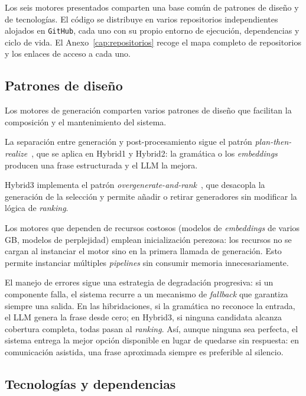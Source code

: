 Los seis motores presentados comparten una base común de patrones de diseño y de tecnologías. El código se distribuye en varios repositorios independientes alojados en \texttt{GitHub}, cada uno con su propio entorno de ejecución, dependencias y ciclo de vida. El Anexo~\ref{cap:repositorios} recoge el mapa completo de repositorios y los enlaces de acceso a cada uno.

\subsection{Patrones de diseño}

Los motores de generación comparten varios patrones de diseño que facilitan la composición y el mantenimiento del sistema.

La separación entre generación y post-procesamiento sigue el patrón \textit{plan-then-realize}~\cite{moryossef2019stepbystep}, que se aplica en Hybrid1 y Hybrid2: la gramática o los \textit{embeddings} producen una frase estructurada y el LLM la mejora.

Hybrid3 implementa el patrón \textit{overgenerate-and-rank}~\cite{sharma2019overgenerate}, que desacopla la generación de la selección y permite añadir o retirar generadores sin modificar la lógica de \textit{ranking}.

Los motores que dependen de recursos costosos (modelos de \textit{embeddings} de varios GB, modelos de perplejidad) emplean inicialización perezosa: los recursos no se cargan al instanciar el motor sino en la primera llamada de generación. Esto permite instanciar múltiples \textit{pipelines} sin consumir memoria innecesariamente.

El manejo de errores sigue una estrategia de degradación progresiva: si un componente falla, el sistema recurre a un mecanismo de \textit{fallback} que garantiza siempre una salida. En las hibridaciones, si la gramática no reconoce la entrada, el LLM genera la frase desde cero; en Hybrid3, si ninguna candidata alcanza cobertura completa, todas pasan al \textit{ranking}. Así, aunque ninguna sea perfecta, el sistema entrega la mejor opción disponible en lugar de quedarse sin respuesta: en comunicación asistida, una frase aproximada siempre es preferible al silencio.

\subsection{Tecnologías y dependencias}

